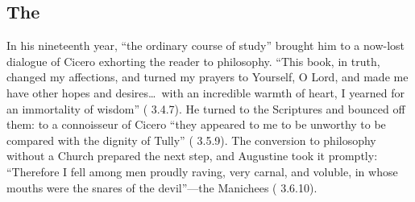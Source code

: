 
\subsection{The }

In his nineteenth year, ``the ordinary course of study'' brought him to a
now-lost dialogue of Cicero exhorting the reader to philosophy. ``This book,
in truth, changed my affections, and turned my prayers to Yourself, O Lord,
and made me have other hopes and desires\ldots\ with an incredible warmth of
heart, I yearned for an immortality of wisdom'' ( 3.4.7).
He turned to the Scriptures and bounced off them: to a connoisseur of
Cicero ``they appeared to me to be unworthy to be compared with the dignity
of Tully'' ( 3.5.9). The conversion to
philosophy without a Church prepared the next step, and Augustine took it
promptly: ``Therefore I fell among men proudly raving, very carnal, and
voluble, in whose mouths were the snares of the devil''---the Manichees
( 3.6.10).
